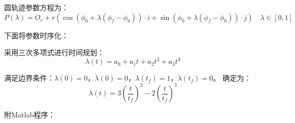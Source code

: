 \documentclass[UTF8,12pt]{ctexart}
\begin{document}
圆轨迹参数方程为：
\[
P(\lambda) = O_c + r(\cos(\phi_0 + \lambda (\phi_f - \phi_0)) \cdot i + \sin(\phi_0 + \lambda (\phi_f - \phi_0)) \cdot j) \quad \lambda \in [0, 1]
\]

\vspace{3em}


下面将参数时序化：

采用三次多项式进行时间规划：
\[
\lambda(t) = a_0 + a_1 t + a_2 t^2 + a_3 t^3
\]

满足边界条件：\(\lambda(0)=0\)，\(\dot{\lambda}(0)=0\)，\(\lambda(t_f)=1\)，\(\dot{\lambda}(t_f)=0\)。
确定为：
\[
\lambda(t) = 3\left(\frac{t}{t_f}\right)^2 - 2\left(\frac{t}{t_f}\right)^3
\]


\vspace{3em}

附Matlab程序：

\end{document}
